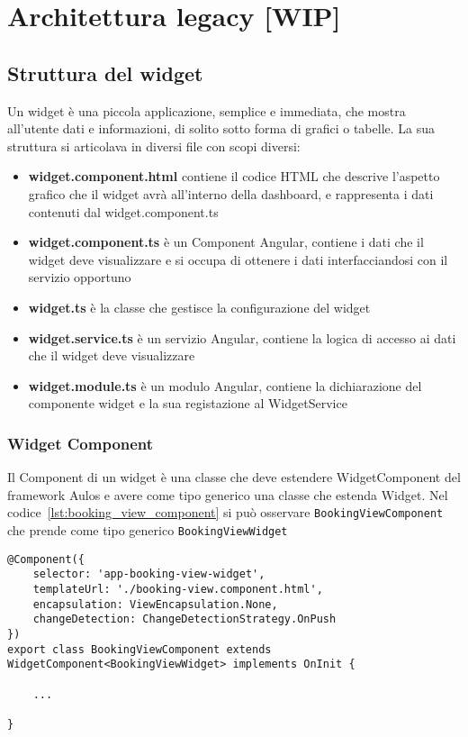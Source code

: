 \chapter{Architettura legacy [WIP]}
\section{Struttura del widget}
Un widget è una piccola applicazione, semplice e immediata, che mostra all'utente dati e informazioni, di solito sotto forma di grafici o tabelle.
La sua struttura si articolava in diversi file con scopi diversi:
\begin{itemize}
\item \textbf{widget.component.html} contiene il codice HTML che descrive l'aspetto grafico che il widget avrà all'interno della dashboard, e rappresenta i dati contenuti dal widget.component.ts
\item \textbf{widget.component.ts} è un Component Angular, contiene i dati che il widget deve visualizzare e si occupa di ottenere i dati interfacciandosi con il servizio opportuno
\item \textbf{widget.ts} è la classe che gestisce la configurazione del widget
\item \textbf{widget.service.ts} è un servizio Angular, contiene la logica di accesso ai dati che il widget deve visualizzare
\item \textbf{widget.module.ts} è un modulo Angular, contiene la dichiarazione del componente widget e la sua registazione al WidgetService
\end{itemize}

\subsection{Widget Component}
Il Component di un widget è una classe che deve estendere WidgetComponent del framework Aulos e avere come tipo generico una classe che estenda Widget. Nel codice~\ref{lst:booking_view_component} si può osservare \verb|BookingViewComponent| che prende come tipo generico \verb|BookingViewWidget|
\begin{lstlisting}[caption={orders.component.ts},label={lst:booking_view_component},style=javascriptCode]
@Component({
    selector: 'app-booking-view-widget',
    templateUrl: './booking-view.component.html',
    encapsulation: ViewEncapsulation.None,
    changeDetection: ChangeDetectionStrategy.OnPush
})
export class BookingViewComponent extends WidgetComponent<BookingViewWidget> implements OnInit {

	...

}
\end{lstlisting}
